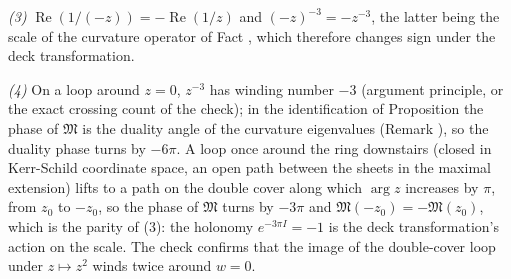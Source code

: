 \emph{(3)} $\operatorname{Re}(1/(-z)) = -\operatorname{Re}(1/z)$ and $(-z)^{-3} = -z^{-3}$, the latter being the scale of the curvature operator of Fact , which therefore changes sign under the deck transformation.

\emph{(4)} On a loop around $z = 0$, $z^{-3}$ has winding number $-3$ (argument principle, or the exact crossing count of the check); in the identification of Proposition  the phase of $\mathfrak M$ is the duality angle of the curvature eigenvalues (Remark ), so the duality phase turns by $-6\pi$. A loop once around the ring downstairs (closed in Kerr-Schild coordinate space, an open path between the sheets in the maximal extension) lifts to a path on the double cover along which $\arg z$ increases by $\pi$, from $z_0$ to $-z_0$, so the phase of $\mathfrak M$ turns by $-3\pi$ and $\mathfrak M(-z_0) = -\mathfrak M(z_0)$, which is the parity of (3): the holonomy $e^{-3\pi I} = -1$ is the deck transformation's action on the scale. The check confirms that the image of the double-cover loop under $z \mapsto z^2$ winds twice around $w = 0$.
